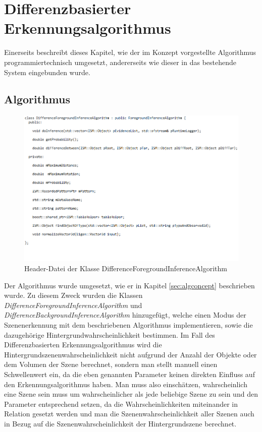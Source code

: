 \section{Differenzbasierter Erkennungsalgorithmus}
Einerseits beschreibt dieses Kapitel, wie der im Konzept vorgestellte Algorithmus programmiertechnisch umgesetzt, andererseits wie dieser in das bestehende System eingebunden wurde. 
\subsection{Algorithmus}\label{sub:alg}
\begin{figure}
	\centering
	\includegraphics[width=14cm]{bilder/DifferenceClass.pdf}
	\caption{Header-Datei der Klasse DifferenceForegroundInferenceAlgorithm}
	\label{img:diffclass}
\end{figure}
Der Algorithmus wurde umgesetzt, wie er in Kapitel \ref{sec:algconcept} beschrieben wurde. Zu diesem Zweck wurden die Klassen \textit{DifferenceForegroundInferenceAlgorithm} und \textit{DifferenceBackgroundInferenceAlgorithm} hinzugefügt, welche einen Modus der Szenenerkennung mit dem beschriebenen Algorithmus implementieren, sowie die dazugehörige Hintergrundwahrscheinlichkeit bestimmen. Im Fall des Differenzbasierten Erkennungsalgorithmus wird die Hintergrundszenenwahrscheinlichkeit nicht aufgrund der Anzahl der Objekte oder dem Volumen der Szene berechnet, sondern man stellt manuell einen Schwellenwert ein, da die eben genannten Parameter keinen direkten Einfluss auf den Erkennungsalgorithmus haben. Man muss also einschätzen, wahrscheinlich eine Szene sein muss um wahrscheinlicher als jede beliebige Szene zu sein und den Parameter entsprechend setzen, da die Wahrscheinlichkeiten miteinander in Relation gesetzt werden und man die Szenenwahrscheinlichkeit aller Szenen auch in Bezug auf die Szenenwahrscheinlichkeit der Hintergrundszene berechnet.\smallskip\\
